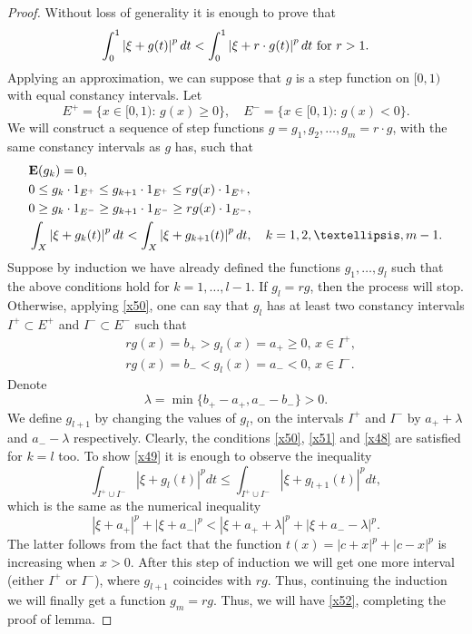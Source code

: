\documentclass[10pt,a4paper]{amsart}
\def\ZE{\ensuremath{\mathbf E}}
\def\ZI{\ensuremath{\textbf 1}}
\newcommand {\e }[1]{\eqref{#1}}
\begin{document}
\begin{proof}
Without loss of generality it is enough to prove that 
\begin{equation}\label{x52}
	\int_0^1\left|\xi+g(t)\right|^pdt<\int_0^1\left|\xi+r\cdot g(t)\right|^pdt\hbox{ for }r>1.
\end{equation}
Applying an approximation, we can suppose that $g$ is a step function on $[0,1)$ with equal constancy intervals. Let 
\begin{equation}
	E^+=\{x\in [0,1):\, g(x)\ge 0\},\quad E^-=\{x\in [0,1):\, g(x)<0\}.
\end{equation}
We will construct a sequence of step functions $g=g_1, g_2,\ldots, g_m=r\cdot g$, with the same constancy intervals as $g$ has, such that  
\begin{align}
	&\ZE(g_k)=0,\label{x50}\\
	&0\le g_k\cdot \ZI_{E^+}\le g_{k+1}\cdot \ZI_{E^+}\le rg(x)\cdot \ZI_{E^+},\label{x51}\\ 
	&0\ge  g_k\cdot \ZI_{E^-}\ge g_{k+1}\cdot \ZI_{E^-}\ge rg(x)\cdot \ZI_{E^-},\label{x48}\\
	&\int_X\left|\xi+g_k(t)\right|^pdt< \int_X\left|\xi+g_{k+1}(t)\right|^pdt,\quad k=1,2,\ldots, m-1.\label{x49}
\end{align}
Suppose by induction we have already defined the functions $g_1,\ldots, g_l$ such that the above conditions hold for $k=1,\ldots, l-1$. If $g_l=rg$, then the process will stop. Otherwise, applying \e{x50}, one can say that $g_l$ has at least two constancy intervals $I^+\subset E^+$ and $I^-\subset E^-$ such that
\begin{align}
	&rg(x)=b_+>g_l(x)=a_+\ge 0,\, x\in I^+,\\
	 &rg(x)=b_-<g_l(x)=a_-<0,\, x\in I^-.
\end{align}
Denote 
\begin{equation}
	\lambda=\min\{b_+- a_+, a_--b_-\}>0.
\end{equation}
We define $g_{l+1}$ by changing the values of $g_l$, on the intervals $I^+$ and $I^-$ by $a_++\lambda$ and $a_--\lambda$ respectively. Clearly, the conditions \e{x50}, \e{x51} and \e{x48} are satisfied for $k=l$ too. To show \e{x49} it is enough to observe the inequality
\begin{equation*}
	\int_{I^+\cup I^-}\left|\xi+g_l(t)\right|^pdt\le \int_{I^+\cup I^-}\left|\xi+g_{l+1}(t)\right|^pdt,
\end{equation*}
which is the same as the numerical inequality
\begin{equation*}
	|\xi+a_+|^p+|\xi+a_-|^p<|\xi+a_++\lambda|^p+|\xi+a_--\lambda|^p.
\end{equation*}
The latter follows from the fact that the function $t(x)=|c+x|^p+|c-x|^p$ is increasing when $x>0$. After this step of induction we will get one more interval (either $I^+$ or $I^-$), where $g_{l+1}$ coincides with $rg$. Thus, continuing the induction we will finally get a function $g_m=rg$. Thus, we will have \e{x52}, completing the proof of lemma.
\end{proof}
\end{document}
